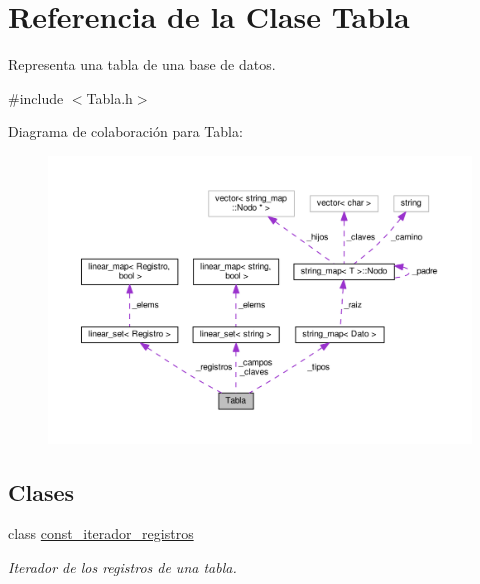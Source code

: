 \hypertarget{classTabla}{\section{Referencia de la Clase Tabla}
\label{classTabla}
}


Representa una tabla de una base de datos.  




{\ttfamily \#include $<$Tabla.\-h$>$}



Diagrama de colaboración para Tabla\-:
\nopagebreak
\begin{figure}[H]
\begin{center}
\leavevmode
\includegraphics[width=350pt]{classTabla__coll__graph}
\end{center}
\end{figure}
\subsection*{Clases}
\begin{DoxyCompactItemize}
\item 
class \hyperlink{classTabla_1_1const__iterador__registros}{const\-\_\-iterador\-\_\-registros}
\begin{DoxyCompactList}\small\item\em Iterador de los registros de una tabla. \end{DoxyCompactList}\end{DoxyCompactItemize}

